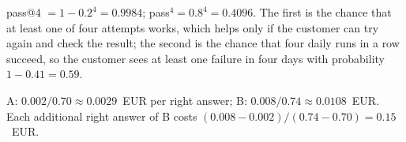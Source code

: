 \begin{description}[font=\bfseries,leftmargin=0pt,itemsep=5pt]
\item[\ref{exr:passk}] pass@4 $=1-0.2^4=0.9984$; pass$^4=0.8^4=0.4096$. The first is the chance that
at least one of four attempts works, which helps only if the customer can try again and check the
result; the second is the chance that four daily runs in a row succeed, so the customer sees at
least one failure in four days with probability $1-0.41=0.59$.
\item[\ref{exr:llmcost}] A: $0.002/0.70\approx0.0029$~EUR per right answer; B: $0.008/0.74\approx0.0108$~EUR.
Each additional right answer of B costs $(0.008-0.002)/(0.74-0.70)=0.15$~EUR.
\end{description}

